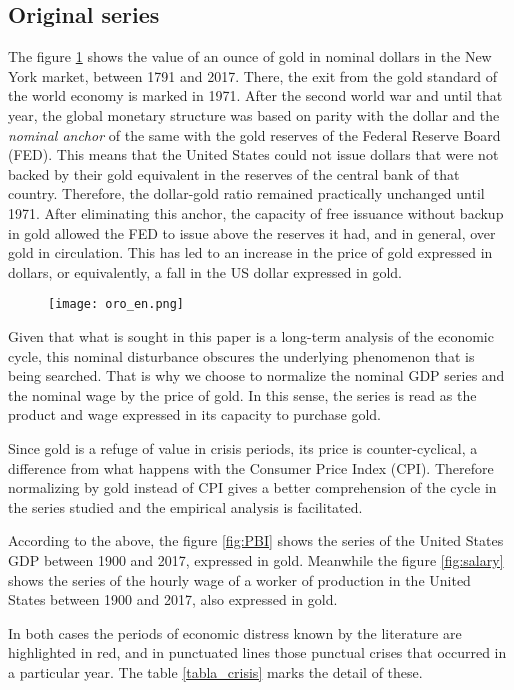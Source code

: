 \documentclass[a4paper]{article}
\begin{document}
\subsection{Original series}

The figure \ref{fig:oro} shows the value of an ounce of gold in nominal dollars in the New York market, between 1791 and 2017. There, the exit from the gold standard of the world economy is marked in 1971. After the second world war and until that year, the global monetary structure was based on parity with the dollar and the \textit{nominal anchor} of the same with the gold reserves of the Federal Reserve Board (FED). This means that the United States could not issue dollars that were not backed by their gold equivalent in the reserves of the central bank of that country. Therefore, the dollar-gold ratio remained practically unchanged until 1971. After eliminating this anchor, the capacity of free issuance without backup in gold allowed the FED to issue above the reserves it had, and in general, over gold in circulation. This has led to an increase in the price of gold expressed in dollars, or equivalently, a fall in the US dollar expressed in gold.

\begin{figure}[H]
	\centering
	\texttt{[image: oro\_en.png]}
	 \caption{}\label{fig:oro}
\end{figure}

Given that what is sought in this paper is a long-term analysis of the economic cycle, this nominal disturbance obscures the underlying phenomenon that is being searched. That is why we choose to normalize the nominal GDP series and the nominal wage by the price of gold. In this sense, the series is read as the product and wage expressed in its capacity to purchase gold.


Since gold is a refuge of value in crisis periods, its price is counter-cyclical, a difference from what happens with the Consumer Price Index (CPI). Therefore normalizing by gold instead of CPI gives a better comprehension of the cycle in the series studied and the empirical analysis is facilitated.

According to the above, the figure \ref{fig:PBI} shows the series of the United States GDP between 1900 and 2017, expressed in gold. Meanwhile the figure \ref{fig:salary} shows the series of the hourly wage of a worker of production in the United States between 1900 and 2017, also expressed in gold.

In both cases the periods of economic distress known by the literature are highlighted in red, and in punctuated lines those punctual crises that occurred in a particular year. The table \ref{tabla_crisis} marks the detail of these.
\end{document}
